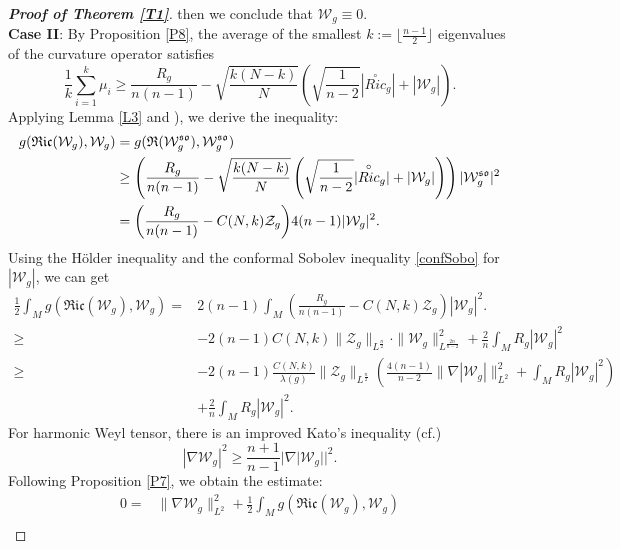 \documentclass[12pt, twoside]{article}
\theoremstyle{definition}
\numberwithin{equation}{section}
\def \la {\lambda}
\def\na {\nabla}
\begin{document}
\begin{proof}[\textbf{Proof of Theorem \ref{T1}}]
	then we conclude that $\mathcal{W}_{g} \equiv 0$.\\
		\textbf{Case II}: By Proposition \ref{P8}, the average of the smallest $k := \lfloor \frac{n-1}{2} \rfloor$ eigenvalues of the curvature operator satisfies
		$$\frac{1}{k}\sum_{i=1}^{k}\mu_{i}\geq \frac{R_{g}}{n(n-1)}-\sqrt{\frac{k(N-k)}{N}}\left(\sqrt{\frac{ 1}{n-2}}|\overset{\circ}{Ric}_{g}|+|\mathcal{W}_{g}|\right).$$
		Applying Lemma \ref{L3} and \cite[Lemma 1.8]{PW21b}), we derive the inequality:
		\begin{equation*}
		\begin{split}
		g(\mathfrak{Ric}(\mathcal{W}_{g}),\mathcal{W}_{g})&=g(\mathfrak{R}(\mathcal{W}^{\mathfrak{so}}_{g}),\mathcal{W}^{\mathfrak{so}}_{g} )\\
		&\geq \left(\frac{R_{g}}{n(n-1)}-\sqrt{\frac{k(N-k)}{N}}\left(\sqrt{\frac{ 1}{n-2}}|\overset{\circ}{Ric}_{g}|+|\mathcal{W}_{g}|\right)\right)|\mathcal{W}^{\mathfrak{so}}_{g}|^{2}\\
		&=\bigg{(}\frac{R_{g}}{n(n-1)}-C(N,k)\mathcal{Z}_{g}\bigg{)}4(n-1)|\mathcal{W}_{g}|^{2}.
		\end{split}
		\end{equation*}
		Using the H\"older inequality and the conformal  Sobolev inequality \eqref{confSobo} for $|\mathcal{W}_{g}|$, we can get
		\begin{align*}
		\frac{1}{2}\int_{M}g(\mathfrak{Ric}(\mathcal{W}_{g}),\mathcal{W}_{g})=&2(n-1)\int_M\left(\frac{R_{g}}{n(n-1)}-C(N,k)\mathcal{Z}_{g}\right)|\mathcal{W}_{g}|^{2}.\\
		\geq& -2(n-1)C(N,k)\|\mathcal{Z}_{g}\|_{L^{ \frac{n}{2} }}\cdot\|\mathcal{W}_{g}\|^{2}_{L^{\frac{2n}{n-2}}}+\frac{2}{n}\int_{M}R_{g}|\mathcal{W}_{g}|^{2}\\
		\geq&-2(n-1)\frac{C(N,k)}{\la(g)}\|\mathcal{Z}_{g}\|_{L^{ \frac{n}{2} }}\left(\frac{4(n-1)}{n-2}\|\na|\mathcal{W}_{g}|\|^{2}_{L^{2}}+\int_{M}R_{g}|\mathcal{W}_{g}|^{2}\right)\\
		&+\frac{2}{n}\int_{M}R_{g}|\mathcal{W}_{g}|^{2}.
		\end{align*}
		For harmonic Weyl tensor, there is an improved Kato's inequality (cf.\cite{Bra00,Tra17})
		$$|\na\mathcal{W}_{g}|^{2}\geq\frac{n+1}{n-1}|\na|\mathcal{W}_{g}||^{2}.$$	
		Following Proposition \ref{P7}, we obtain the estimate:
		\begin{equation*}
		\begin{split}
		0=&\|\na\mathcal{W}_{g}\|^{2}_{L^{2}}+\frac{1}{2}\int_{M}g(\mathfrak{Ric}(\mathcal{W}_{g}),\mathcal{W}_{g})\\

\end{split}
\end{equation*}
\end{proof}
\end{document}
